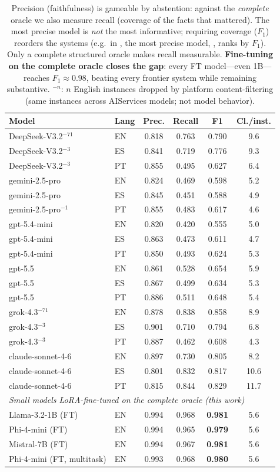 \begin{table}[t]
\centering\small
\begin{tabular}{llcccc}
\toprule
Model & Lang & Prec. & Recall & F1 & Cl./inst. \\
\midrule
DeepSeek-V3.2$^{-71}$ & EN & 0.818 & 0.763 & 0.790 & 9.6 \\
DeepSeek-V3.2$^{-3}$ & ES & 0.841 & 0.719 & 0.776 & 9.3 \\
DeepSeek-V3.2$^{-3}$ & PT & 0.855 & 0.495 & 0.627 & 6.4 \\
gemini-2.5-pro & EN & 0.824 & 0.469 & 0.598 & 5.2 \\
gemini-2.5-pro & ES & 0.845 & 0.451 & 0.588 & 4.9 \\
gemini-2.5-pro$^{-1}$ & PT & 0.855 & 0.483 & 0.617 & 4.6 \\
gpt-5.4-mini & EN & 0.820 & 0.420 & 0.555 & 5.0 \\
gpt-5.4-mini & ES & 0.863 & 0.473 & 0.611 & 4.7 \\
gpt-5.4-mini & PT & 0.850 & 0.493 & 0.624 & 5.3 \\
gpt-5.5 & EN & 0.861 & 0.528 & 0.654 & 5.9 \\
gpt-5.5 & ES & 0.867 & 0.499 & 0.634 & 5.3 \\
gpt-5.5 & PT & 0.886 & 0.511 & 0.648 & 5.4 \\
grok-4.3$^{-71}$ & EN & 0.878 & 0.838 & 0.858 & 8.9 \\
grok-4.3$^{-3}$ & ES & 0.901 & 0.710 & 0.794 & 6.8 \\
grok-4.3$^{-3}$ & PT & 0.887 & 0.462 & 0.608 & 4.3 \\
claude-sonnet-4-6 & EN & 0.897 & 0.730 & 0.805 & 8.2 \\
claude-sonnet-4-6 & ES & 0.801 & 0.832 & 0.817 & 10.6 \\
claude-sonnet-4-6 & PT & 0.815 & 0.844 & 0.829 & 11.7 \\
\midrule
\multicolumn{6}{l}{\emph{Small models LoRA-fine-tuned on the complete oracle (this work)}}\\
\midrule
Llama-3.2-1B (FT) & EN & 0.994 & 0.968 & \textbf{0.981} & 5.6 \\
Phi-4-mini (FT) & EN & 0.994 & 0.965 & \textbf{0.979} & 5.6 \\
Mistral-7B (FT) & EN & 0.994 & 0.967 & \textbf{0.981} & 5.6 \\
Phi-4-mini (FT, multitask) & EN & 0.993 & 0.968 & \textbf{0.980} & 5.6 \\
\bottomrule
\end{tabular}
\caption{Precision (faithfulness) is gameable by abstention: against the \emph{complete} oracle we also measure recall (coverage of the facts that mattered). The most precise model is \emph{not} the most informative; requiring coverage ($F_1$) reorders the systems (e.g.\ in \CovLang{}, the most precise model, \CovFlipModel{}, ranks \CovFlipFRank{} by $F_1$). Only a complete structured oracle makes recall measurable. \textbf{Fine-tuning on the complete oracle closes the gap}: every FT model---even 1B---reaches $F_1 \approx 0.98$, beating every frontier system while remaining substantive. $^{-n}$: $n$ English instances dropped by platform content-filtering (same instances across AIServices models; not model behavior).}
\label{tab:coverage}
\end{table}
